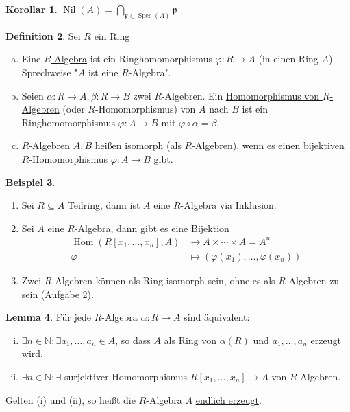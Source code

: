 \documentclass[
twoside=semi,
fontsize=12,
DIV=12, 
cleardoublepage=current,
leqno,
headings=optiontoheadandtoc, 
toc=idx
]{scrbook}
\newcommand{\N}{\mathbb{N}}
\newcommand{\emphasize}[1]{\underline{#1}}
\DeclareMathOperator{\Hom}{Hom}
\DeclareMathOperator{\Nil}{Nil}
\DeclareMathOperator{\Spec}{Spec}
\theoremstyle{definition}
\newtheorem{definition}{Definition}[section]
\newtheorem{beispiel}[definition]{Beispiel}
\newtheorem{lemma}[definition]{Lemma}
\newtheorem{korollar}[definition]{Korollar}
\begin{document}
	\begin{korollar}\label{1.1.5}\hfill\newline
		$\Nil(A) = \displaystyle \bigcap_{\mathfrak{p}\in \Spec(A)} \mathfrak{p}$
	\end{korollar}

	\begin{definition}\label{1.1.6}\hfill\newline
		Sei $R$ ein Ring
		\begin{enumerate}[(a)]
			\item Eine \emphasize{$R$-Algebra} ist ein Ringhomomorphismus $\varphi:R \to A$ (in einen Ring $A$). Sprechweise "$A$ ist eine $R$-Algebra".
			
			\item Seien $\alpha:R \to A, \beta:R\to B$ zwei $R$-Algebren. Ein \emphasize{Homomorphismus von $R$-Algebren} (oder $R$-Homomorphismus) von $A$ nach $B$ ist ein Ringhomomorphismus $\varphi:A \to B$ mit $\varphi \circ \alpha = \beta$.
			
 			\item $R$-Algebren $A, B$ hei\ss en \emphasize{isomorph} (als \emphasize{$R$-Algebren}), wenn es einen bijektiven \newline $R$-Homomorphismus $\varphi:A \to B$ gibt.
		\end{enumerate}
	\end{definition}

	\begin{beispiel}\label{1.1.7}\hfill
		\begin{enumerate}[1.]
			\item Sei $R \subseteq A$ Teilring, dann ist $A$ eine $R$-Algebra via Inklusion.
			
			\item \label{1.1.7.2} Sei $A$ eine $R$-Algebra, dann gibt es eine Bijektion
			\begin{align*}
				\Hom(R[x_1, \dots, x_n], A) &\to A\times \cdots \times A = A^n\\
				\varphi &\mapsto (\varphi(x_1), \dots, \varphi(x_n))
			\end{align*}
		
			\item Zwei $R$-Algebren k\"onnen als Ring isomorph sein, ohne es als $R$-Algebren zu sein (Aufgabe 2).
		\end{enumerate}
	\end{beispiel}

	\begin{lemma}\label{1.1.8}\hfill\newline
		F\"ur jede $R$-Algebra $\alpha:R \to A$ sind \"aquivalent:
		\begin{enumerate}[(i)]
			\item\label{1.1.8.1} $\exists n \in \N: \exists a_1, \dots, a_n \in A$, so dass $A$ als Ring von $\alpha(R)$ und $a_1, \dots, a_n$ erzeugt wird.
			
			\item\label{1.1.8.2} $\exists n \in \N: \exists$ surjektiver Homomorphismus $R[x_1, \dots, x_n] \to A$ von $R$-Algebren.
		\end{enumerate}
		Gelten (i) und (ii), so hei\ss t die $R$-Algebra $A$ \emphasize{endlich erzeugt}.
	\end{lemma}
\end{document}
